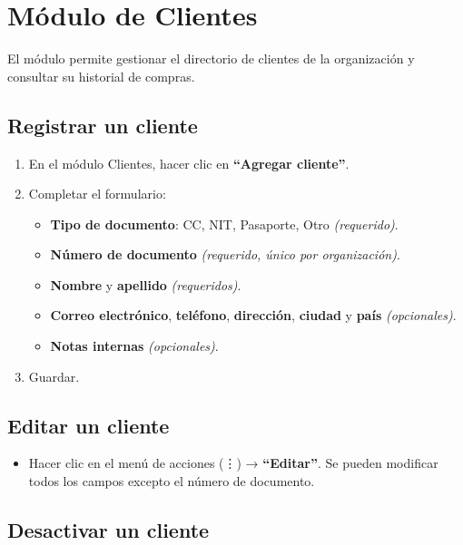 \section{Módulo de Clientes}\label{muxf3dulo-de-clientes}

El módulo permite gestionar el directorio de clientes de la organización y consultar su historial de compras.

\subsection{Registrar un cliente}\label{registrar-un-cliente}

\begin{enumerate}
\def\labelenumi{\arabic{enumi}.}
\tightlist
\item
  En el módulo Clientes, hacer clic en \textbf{``Agregar cliente''}.
\item
  Completar el formulario:

  \begin{itemize}
  \tightlist
  \item
    \textbf{Tipo de documento}: CC, NIT, Pasaporte, Otro \emph{(requerido)}.
  \item
    \textbf{Número de documento} \emph{(requerido, único por organización)}.
  \item
    \textbf{Nombre} y \textbf{apellido} \emph{(requeridos)}.
  \item
    \textbf{Correo electrónico}, \textbf{teléfono}, \textbf{dirección}, \textbf{ciudad} y \textbf{país} \emph{(opcionales)}.
  \item
    \textbf{Notas internas} \emph{(opcionales)}.
  \end{itemize}
\item
  Guardar.
\end{enumerate}

\subsection{Editar un cliente}\label{editar-un-cliente}

\begin{itemize}
\tightlist
\item
  Hacer clic en el menú de acciones (⋮) → \textbf{``Editar''}. Se pueden modificar todos los campos excepto el número de documento.
\end{itemize}

\subsection{Desactivar un cliente}\label{desactivar-un-cliente}

